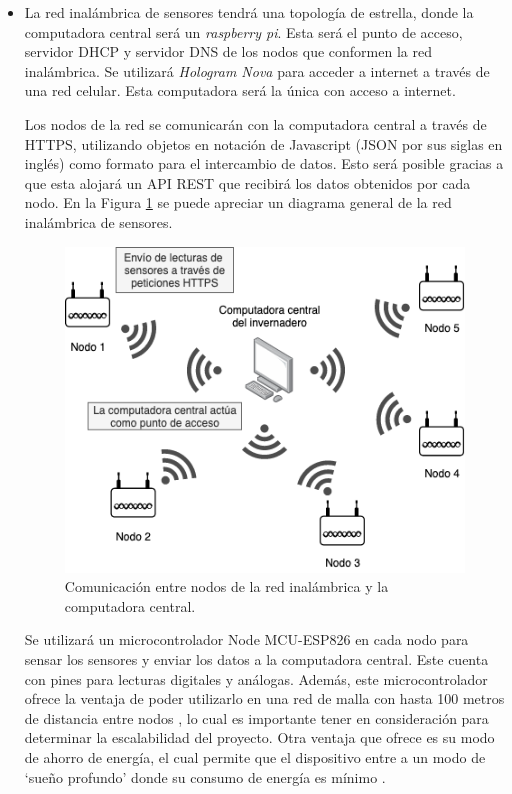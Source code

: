 \begin{itemize}
	
	\item La red inalámbrica de sensores tendrá una topología de estrella, donde la computadora central será un \textit{raspberry pi}. Esta será el punto de acceso, servidor DHCP y servidor DNS de los nodos que conformen la red inalámbrica. Se utilizará \textit{Hologram Nova} para acceder a internet a través de una red celular. Esta computadora será la única con acceso a internet.

	Los nodos de la red se comunicarán con la computadora central a través de HTTPS, utilizando objetos en notación de Javascript (JSON por sus siglas en inglés) como formato para el intercambio de datos. Esto será posible gracias a que esta alojará un API REST que recibirá los datos obtenidos por cada nodo. En la Figura \ref{fig:coms_nodos_raspberry} se puede apreciar un diagrama general de la red inalámbrica de sensores.

	\begin{figure}[!ht]
		\centering
		\includegraphics[width=.60\linewidth]{imagenes/diagramas/comunicacion_nodos_raspberry.png}
		\caption{Comunicación entre nodos de la red inalámbrica y la computadora central.}
		\label{fig:coms_nodos_raspberry}
	\end{figure}

	Se utilizará un microcontrolador Node MCU-ESP826 en cada nodo para sensar los sensores y enviar los datos a la computadora central. Este cuenta con pines para lecturas digitales y análogas. Además, este microcontrolador ofrece la ventaja de poder utilizarlo en una red de malla con hasta 100 metros de distancia entre nodos \cite{nodemcu_mesh}, lo cual es importante tener en consideración para determinar la escalabilidad del proyecto. Otra ventaja que ofrece es su modo de ahorro de energía, el cual permite que el dispositivo entre a un modo de `sueño profundo' donde su consumo de energía es mínimo \cite{nodemcu_datasheet}. 


\end{itemize}
